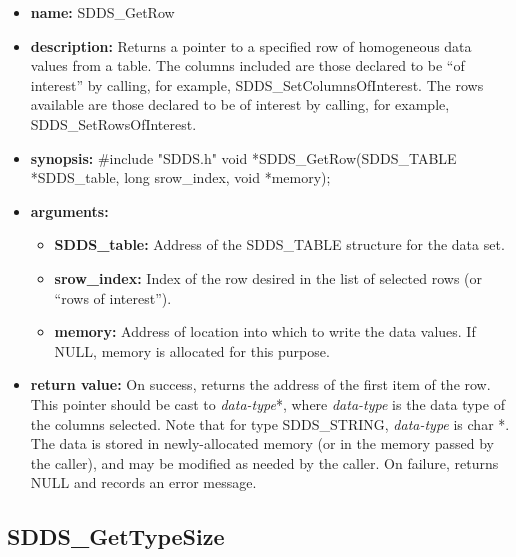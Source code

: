 \documentclass[11pt]{article}
\begin{document}
\begin{itemize}
\item {\bf name:}\newline
SDDS\_GetRow
\item {\bf description:}\newline
Returns a pointer to a specified row of homogeneous data values from a table. The columns included are those declared to be ``of interest'' by calling, for example, SDDS\_SetColumnsOfInterest. The rows available are those declared to be of interest by calling, for example, SDDS\_SetRowsOfInterest.
\item {\bf synopsis:} \#include "SDDS.h"\newline
void *SDDS\_GetRow(SDDS\_TABLE *SDDS\_table, long srow\_index, void *memory);
\item {\bf arguments:}
\begin{itemize}
\item {\bf SDDS\_table:} Address of the SDDS\_TABLE structure for the data set.
\item {\bf srow\_index:} Index of the row desired in the list of selected rows (or ``rows of interest'').
\item {\bf memory:} Address of location into which to write the data values. If NULL, memory is allocated for this purpose.
\end{itemize}
\item {\bf return value:}\newline
On success, returns the address of the first item of the row. This pointer should be cast to {\em data-type}*, where {\em data-type} is the data type of the columns selected. Note that for type SDDS\_STRING, {\em data-type} is char *. The data is stored in newly-allocated memory (or in the memory passed by the caller), and may be modified as needed by the caller.\newline
\newline
On failure, returns NULL and records an error message. 
\end{itemize}

\subsection{SDDS\_GetTypeSize}
\label{SDDS_GetTypeSize}
\end{document}
